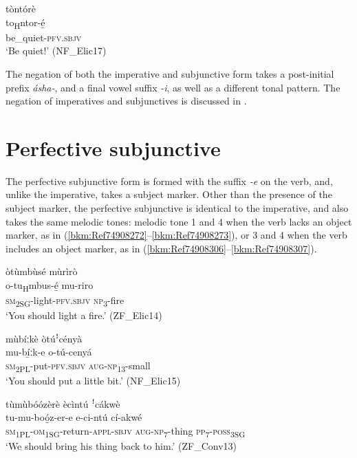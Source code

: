 \ea
\label{bkm:Ref98771152}
\glll tòntórè\\
to\textsubscript{H}ntor-é̲\\
be\_quiet-\textsc{pfv}.\textsc{sbjv}\\
\glt ‘Be quiet!’ (NF\_Elic17)
\z

The negation of both the imperative and subjunctive form takes a post-initial prefix \textit{ásha-}, and a final vowel suffix \textit{-i}, as well as a different tonal pattern. The negation of imperatives and subjunctives is discussed in .

\section{Perfective subjunctive}
\label{bkm:Ref492309168}\hypertarget{Toc75352701}{}
The perfective subjunctive form is formed with the suffix \textit{-e} on the verb, and, unlike the imperative, takes a subject marker. Other than the presence of the subject marker, the perfective subjunctive is identical to the imperative, and also takes the same melodic tones: melodic tone 1 and 4 when the verb lacks an object marker, as in (\ref{bkm:Ref74908272}--\ref{bkm:Ref74908273}), or 3 and 4 when the verb includes an object marker, as in (\ref{bkm:Ref74908306}--\ref{bkm:Ref74908307}).

\ea
\label{bkm:Ref74908272}
òtùmbùsé mùrìrò\\
\gll o-tu\textsubscript{H}mbus-é̲      mu-riro\\
\textsc{sm}\textsubscript{2SG}-light-\textsc{pfv}.\textsc{sbjv}  \textsc{np}\textsubscript{3}-fire\\
\glt ‘You should light a fire.’ (ZF\_Elic14)
\z

\ea
\label{bkm:Ref74908273}
mùbíːkè òtúꜝcényà\\
\gll mu-bí̲ːk-e    o-tú-cenyá\\
\textsc{sm}\textsubscript{2PL}-put-\textsc{pfv}.\textsc{sbjv}  \textsc{aug}-\textsc{np}\textsubscript{13}-small\\
\glt ‘You should put a little bit.’ (NF\_Elic15)
\z

\ea
\label{bkm:Ref74908306}
tùmùbóózèrè ècìntú ꜝcákwè\\
\gll tu-mu-boó̲z-er-e      e-ci-ntú    cí-akwé\\
\textsc{sm}\textsubscript{1PL}-\textsc{om}\textsubscript{1SG}-return-\textsc{appl}-\textsc{sbjv}   \textsc{aug}-\textsc{np}\textsubscript{7}-thing  \textsc{pp}\textsubscript{7}-\textsc{poss}\textsubscript{3SG}\\
\glt ‘We should bring his thing back to him.’ (ZF\_Conv13)
\z

